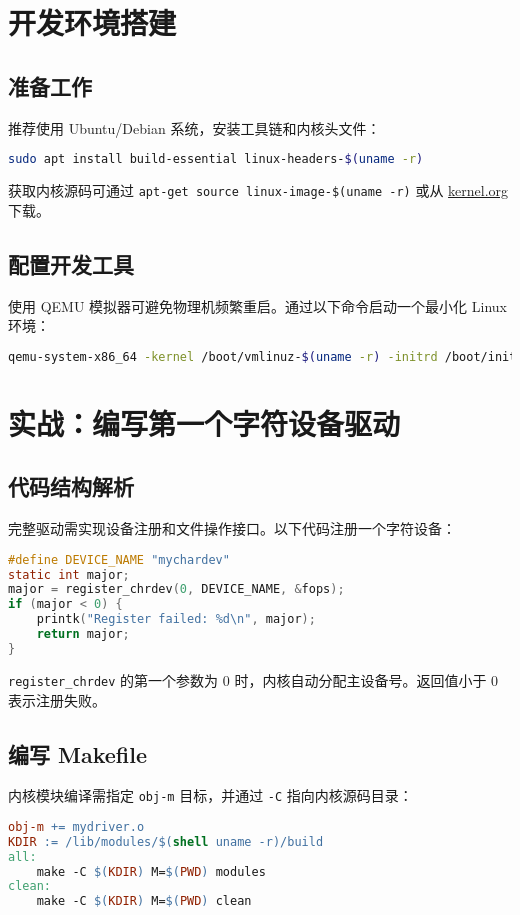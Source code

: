 \chapter{开发环境搭建}
\section{准备工作}
推荐使用 Ubuntu/Debian 系统，安装工具链和内核头文件：\par
\begin{lstlisting}[language=bash]
sudo apt install build-essential linux-headers-$(uname -r)  
\end{lstlisting}
获取内核源码可通过 \verb!apt-get source linux-image-$(uname -r)! 或从 \href{https://www.kernel.org/}{kernel.org} 下载。\par
\section{配置开发工具}
使用 QEMU 模拟器可避免物理机频繁重启。通过以下命令启动一个最小化 Linux 环境：\par
\begin{lstlisting}[language=bash]
qemu-system-x86_64 -kernel /boot/vmlinuz-$(uname -r) -initrd /boot/initrd.img-$(uname -r)  
\end{lstlisting}
\chapter{实战：编写第一个字符设备驱动}
\section{代码结构解析}
完整驱动需实现设备注册和文件操作接口。以下代码注册一个字符设备：\par
\begin{lstlisting}[language=c]
#define DEVICE_NAME "mychardev"  
static int major;  
major = register_chrdev(0, DEVICE_NAME, &fops);  
if (major < 0) {  
    printk("Register failed: %d\n", major);  
    return major;  
}  
\end{lstlisting}
\verb!register_chrdev! 的第一个参数为 0 时，内核自动分配主设备号。返回值小于 0 表示注册失败。\par
\section{编写 Makefile}
内核模块编译需指定 \verb!obj-m! 目标，并通过 \verb!-C! 指向内核源码目录：\par
\begin{lstlisting}[language=makefile]
obj-m += mydriver.o  
KDIR := /lib/modules/$(shell uname -r)/build  
all:  
    make -C $(KDIR) M=$(PWD) modules  
clean:  
    make -C $(KDIR) M=$(PWD) clean  
\end{lstlisting}
